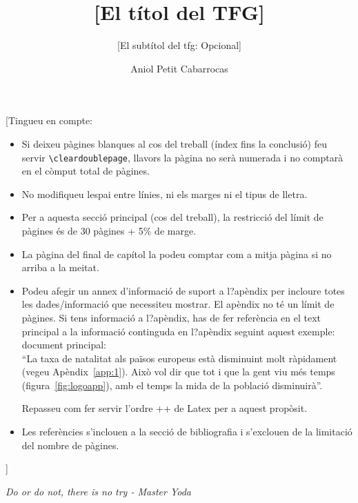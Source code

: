 \documentclass[11pt, a4paper,twoside]{tfg_dtic_upf}
\title{[El títol del TFG]}
\subtitle{[El subtítol del tfg: Opcional]}
\author{Aniol Petit Cabarrocas}
\numberwithin{equation}{section}
\begin{document}
\frontmatter

\maketitle





[Tingueu en compte:

\begin{itemize}
	\item[(i)] Si deixeu pàgines blanques al cos del treball (índex fins la conclusió) feu servir \verb+\cleardoublepage+, llavors la pàgina no serà numerada i no comptarà en el còmput total de pàgines. 
	 \item[(ii)] No modifiqueu lespai entre línies, ni els marges ni el tipus de lletra.
	 \item[(iii)] Per a aquesta secció principal (cos del treball), la restricció del límit de pàgines és de 30 pàgines + 5$\%$ de marge.
	 \item[(iv)]  La pàgina del final de capítol la podeu comptar com a mitja pàgina si no arriba a la meitat.
	 \item[(v)] Podeu afegir un annex d'informació de suport a l?apèndix per incloure totes les dades/informació que necessiteu mostrar. El apèndix no té un límit de pàgines. Si tens informació a l?apèndix, has de fer referència en el text principal a la informació continguda en l?apèndix seguint aquest exemple:\\
	 
	 document principal:\\``La taxa de natalitat als països europeus està disminuint molt ràpidament (vegeu Apèndix~\ref{app:1}). Això vol dir que tot i que la gent viu més temps (figura~\ref{fig:logoapp}), amb el temps la mida de la població disminuirà''.
	 
	
	 
	 Repasseu com fer servir l'ordre +\label{}+ de Latex per a aquest propòsit.
	 \item[(v)]  Les referències s'inclouen a la secció de bibliografia i s'exclouen de la limitació del nombre de pàgines. 
\end{itemize}
]


\cleardoublepage


%
\noindent \textit{Do or do not, there is no try - Master Yoda} 

\cleardoublepage
\end{document}
